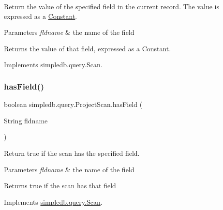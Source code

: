 Return the value of the specified field in the current record. The value is expressed as a \hyperlink{classsimpledb_1_1query_1_1Constant}{Constant}. 
\begin{DoxyParams}{Parameters}
{\em fldname} & the name of the field \\
\hline
\end{DoxyParams}
\begin{DoxyReturn}{Returns}
the value of that field, expressed as a \hyperlink{classsimpledb_1_1query_1_1Constant}{Constant}. 
\end{DoxyReturn}


Implements \hyperlink{interfacesimpledb_1_1query_1_1Scan_aca80bca2857c983a88834bf6c01ee5ca}{simpledb.\+query.\+Scan}.

\mbox{\label{classsimpledb_1_1query_1_1ProjectScan_aff65421fc21f24723e730cb1d26fa6ed}} 
\subsubsection{\texorpdfstring{has\+Field()}{hasField()}}
{\footnotesize\ttfamily boolean simpledb.\+query.\+Project\+Scan.\+has\+Field (\begin{DoxyParamCaption}\item[{String}]{fldname }\end{DoxyParamCaption})\hspace{0.3cm}{\ttfamily [inline]}}

Return true if the scan has the specified field. 
\begin{DoxyParams}{Parameters}
{\em fldname} & the name of the field \\
\hline
\end{DoxyParams}
\begin{DoxyReturn}{Returns}
true if the scan has that field 
\end{DoxyReturn}


Implements \hyperlink{interfacesimpledb_1_1query_1_1Scan_a8f4ccf13eed0bed983c928e9b998fe5c}{simpledb.\+query.\+Scan}.

\mbox{\label{classsimpledb_1_1query_1_1ProjectScan_ae90eaf25301873aba0a2f743becf7c9a}} 
